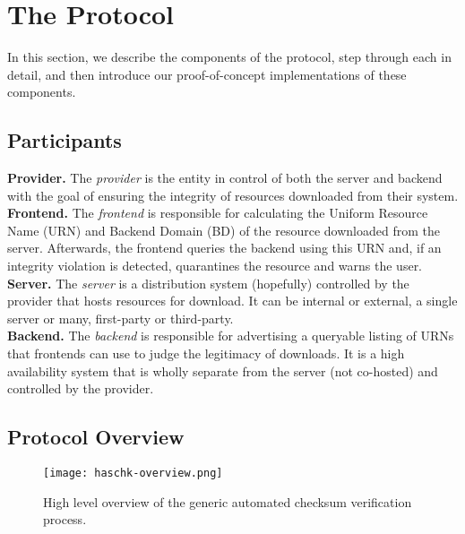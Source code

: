 \section{The \SYSTEM{} Protocol} \label{sec:approach}

In this section, we describe the components of the \SYSTEM{} protocol, step
through each in detail, and then introduce our proof-of-concept implementations
of these components.

\subsection{Participants}

\noindent\textbf{Provider.} The \emph{provider} is the entity in control of both
the server and backend with the goal of ensuring the integrity of resources
downloaded from their system. \\

\noindent\textbf{\SYSTEM{} Frontend.} The \emph{frontend} is responsible for
calculating the Uniform Resource Name (URN) and Backend Domain (BD) of the
resource downloaded from the server. Afterwards, the frontend queries the
backend using this URN and, if an integrity violation is detected, quarantines
the resource and warns the user. \\

\noindent\textbf{Server.} The \emph{server} is a distribution system (hopefully)
controlled by the provider that hosts resources for download. It can be internal
or external, a single server or many, first-party or third-party. \\

\noindent\textbf{\SYSTEM{} Backend.} The \emph{backend} is responsible for
advertising a queryable listing of URNs that \SYSTEM{} frontends can use to
judge the legitimacy of downloads. It is a high availability system that is
wholly separate from the server (not co-hosted) and controlled by the provider.

\subsection{Protocol Overview}

\begin{figure}[ht]
    \centering
    \texttt{[image: haschk-overview.png]}
    \caption{High level overview of the generic automated checksum verification
    process.}\label{fig:protocol}
\end{figure}

